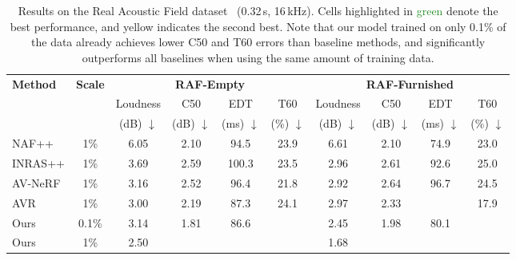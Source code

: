 \documentclass[letterpaper]{article} %
\begin{document}
\begin{table*}[ht]
    \centering
    \begin{tabular}{l c cccc cccc}
    \toprule
   \multirow{3}{*}{\textbf{Method}}&\multirow{3}{*}{\textbf{Scale}} &\multicolumn{4}{c}{\bfseries RAF-Empty}&\multicolumn{4}{c}{\bfseries RAF-Furnished }\\
   \cmidrule(lr){3-6} \cmidrule(lr){7-10}
       &  &Loudness & C50 & EDT & T60 &Loudness & C50 & EDT & T60  \\
        &   & (dB) $\downarrow$ & (dB) $\downarrow$ & (ms) $\downarrow$ & (\%) $\downarrow$  & (dB) $\downarrow$ & (dB) $\downarrow$ & (ms) $\downarrow$ & (\%) $\downarrow$\\
         \midrule
        NAF++ \cite{chen2024RAF, luo2022learning} & 1\%  & 6.05 &2.10&94.5&23.9 & 6.61 &2.10 & 74.9 & 23.0 \\
        INRAS++ \cite{chen2024RAF, su2022inras} & 1\%   & 3.69 &2.59&100.3&23.5 &2.96 &2.61&92.6 & 25.0\\
        AV-NeRF \cite{liang23avnerf} & 1\%   & 3.16 & 2.52 & 96.4 &  21.8  & 2.92 & 2.64  & 96.7 & 24.5  \\
        AVR \cite{avr} & 1\%  & \cellcolor{lemonchiffon}3.00 & 2.19& {87.3} & 24.1& 2.97 &  2.33 & \cellcolor{lemonchiffon}{72.3} & 17.9  \\
         \midrule
        Ours & 0.1\%  & 3.14 &\cellcolor{lemonchiffon}1.81&\cellcolor{lemonchiffon}86.6& \cellcolor{lemonchiffon}{16.9} & \cellcolor{lemonchiffon}2.45 &\cellcolor{lemonchiffon}1.98&80.1 &\cellcolor{lemonchiffon}{15.2}\\
        Ours & 1\%   & \cellcolor{grannysmithapple}2.50 &\cellcolor{grannysmithapple}{1.42}& \cellcolor{grannysmithapple}{56.2} &\cellcolor{grannysmithapple}{10.7}&\cellcolor{grannysmithapple}1.68 & \cellcolor{grannysmithapple}{1.29} & \cellcolor{grannysmithapple}{47.4} & \cellcolor{grannysmithapple}{9.61}   \\
        \bottomrule
    \end{tabular}
    \caption{
    Results on the Real Acoustic Field dataset~\cite{chen2024RAF} (0.32\,s, 16\,kHz). Cells highlighted in \textcolor{ForestGreen}{green} denote the best performance, and \textcolor{Dandelion}{yellow} indicates the second best. Note that our model trained on only 0.1\% of the data already achieves lower C50 and T60 errors than baseline methods, and significantly outperforms all baselines when using the same amount of training data.
    }
    \vspace{-0.1in}
    \label{tab:exp-raf}
\end{table*}
\end{document}
